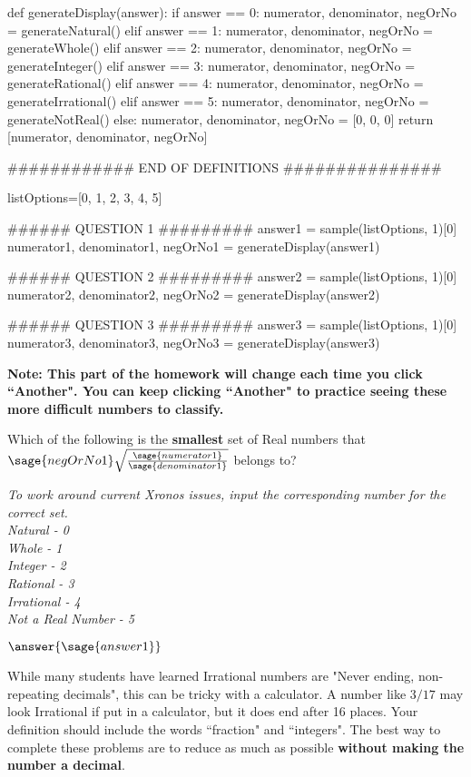 \documentclass{ximera}
\begin{document}
\begin{sagesilent}
def generateDisplay(answer):
    if answer == 0:
        numerator, denominator, negOrNo = generateNatural()
    elif answer == 1:
        numerator, denominator, negOrNo = generateWhole()
    elif answer == 2:
        numerator, denominator, negOrNo = generateInteger()
    elif answer == 3:
        numerator, denominator, negOrNo = generateRational()
    elif answer == 4:
        numerator, denominator, negOrNo = generateIrrational()
    elif answer == 5:
        numerator, denominator, negOrNo = generateNotReal()
    else:
        numerator, denominator, negOrNo = [0, 0, 0]
    return [numerator, denominator, negOrNo]

############ END OF DEFINITIONS ###############

listOptions=[0, 1, 2, 3, 4, 5]

###### QUESTION 1 #########
answer1 = sample(listOptions, 1)[0]
numerator1, denominator1, negOrNo1 = generateDisplay(answer1)

###### QUESTION 2 #########
answer2 = sample(listOptions, 1)[0]
numerator2, denominator2, negOrNo2 = generateDisplay(answer2)

###### QUESTION 3 #########
answer3 = sample(listOptions, 1)[0]
numerator3, denominator3, negOrNo3 = generateDisplay(answer3)

\end{sagesilent}

\textbf{Note: This part of the homework will change each time you click ``Another". You can keep clicking ``Another" to practice seeing these more difficult numbers to classify.}

\begin{exercise}
Which of the following is the \textbf{smallest} set of Real numbers that $\sage{negOrNo1} \sqrt{ \frac{\sage{numerator1}}{\sage{denominator1}}} $ belongs to?

\textit{To work around current Xronos issues, input the corresponding number for the correct set. \\
Natural - 0 \\
Whole - 1 \\
Integer - 2 \\
Rational - 3 \\
Irrational - 4 \\
Not a Real Number - 5
}

$\answer{\sage{answer1}}$

\begin{hint}
While many students have learned Irrational numbers are "Never ending, non-repeating decimals", this can be tricky with a calculator. A number like $3/17$ may look Irrational if put in a calculator, but it does end after 16 places. Your definition should include the words ``fraction" and ``integers". The best way to complete these problems are to reduce as much as possible \textbf{without making the number a decimal}.
\end{hint}
\end{exercise}
\end{document}
